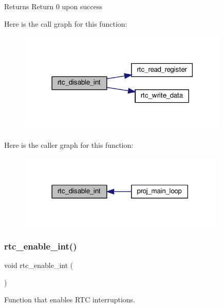 \begin{DoxyReturn}{Returns}
Return 0 upon success 
\end{DoxyReturn}
Here is the call graph for this function\+:
\nopagebreak
\begin{figure}[H]
\begin{center}
\leavevmode
\includegraphics[width=285pt]{group__rtc_ga0f8758bf0df6766696104c3be6c0c6ea_cgraph}
\end{center}
\end{figure}
Here is the caller graph for this function\+:\nopagebreak
\begin{figure}[H]
\begin{center}
\leavevmode
\includegraphics[width=278pt]{group__rtc_ga0f8758bf0df6766696104c3be6c0c6ea_icgraph}
\end{center}
\end{figure}
\mbox{\label{group__rtc_ga8d098a183fdb5fc38da0335041c4d3db}} 
\subsubsection{\texorpdfstring{rtc\+\_\+enable\+\_\+int()}{rtc\_enable\_int()}}
{\footnotesize\ttfamily void rtc\+\_\+enable\+\_\+int (\begin{DoxyParamCaption}{ }\end{DoxyParamCaption})}



Function that enables R\+TC interruptions. 

